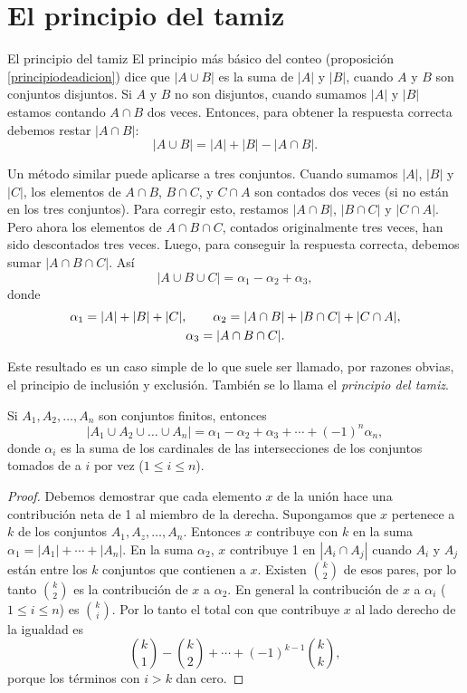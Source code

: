 

\appendix
\setcounter{chapter}{1}
\renewcommand{\thechapter}{\Alph{chapter}}
\chapter[El principio del tamiz]{El principio del tamiz} \label{principiodeltamiz}

\begin{section}{El principio del tamiz}\label{Ap1.2}
El principio más básico del conteo (proposición \ref{principiodeadicion}) dice que $|A \cup B|$ es la suma de $|A|$ y $|B|$, cuando $A$ y $B$ son conjuntos disjuntos. Si $A$ y $B$ no son disjuntos, cuando sumamos $|A|$ y $|B|$ estamos contando $A \cap B$ dos veces. Entonces, para obtener la respuesta correcta debemos restar $|A \cap B|$:
$$
|A \cup B| = |A|+|B| - |A \cap B|.
$$

Un método similar puede aplicarse a tres conjuntos. Cuando sumamos $|A|$, $|B|$ y $|C|$, los elementos de $A \cap B$, $B \cap C$, y $C \cap A$ son contados dos veces (si no están en los tres conjuntos). Para corregir esto, restamos $|A \cap B|$, $|B \cap C|$ y $|C \cap A|$. Pero ahora los elementos de $A \cap B \cap C$, contados originalmente tres veces, han sido descontados tres veces. Luego, para conseguir la respuesta correcta, debemos sumar $|A \cap B \cap C|$. Así
$$
|A \cup B\cup C|= \alpha_1-\alpha_2+\alpha_3,
$$ 
donde
$$\gathered
\alpha_1=|A|+|B|+|C|,\qquad \alpha_2= |A \cap B|+|B \cap C|+|C \cap A|, \\
\alpha_3 = |A \cap B \cap C|.
\endgathered
$$

Este resultado es un caso simple de lo que suele ser llamado, por razones obvias, el principio de inclusión y exclusión. También  se lo llama el \textit{principio del tamiz}.  

\begin{teorema}\label{tA1.2} Si $A_1,A_2,\ldots,A_n$ son conjuntos finitos, entonces 
$$ |A_1 \cup A_2 \cup \ldots \cup A_n|= \alpha_1-\alpha_2+\alpha_3 + \cdots +(-1)^n\alpha_n, $$ donde $\alpha_i$ es la suma de los cardinales de las intersecciones de los conjuntos tomados de a $i$ por vez ($1\le i \le n$).
\end{teorema}
\begin{proof} Debemos demostrar que cada elemento $x$ de la unión hace una contribución neta de 1 al miembro de la derecha. Supongamos que $x$ pertenece a $k$ de los conjuntos $A_1, A_z,\ldots,A_n$. Entonces $x$  contribuye con $k$ en la suma $\alpha_1=|A_1|+\cdots+|A_n|$. En la suma $\alpha_2$, $x$ contribuye 1 en $|A_i \cap A_j|$ cuando $A_i$ y $A_j$ están entre los $k$ conjuntos que contienen a $x$. Existen $\binom{k}{2}$ de esos pares, por lo tanto $\binom{k}{2}$ es la contribución de $x$ a $\alpha_2$. En general la contribución de $x$ a $\alpha_i$ ($1 \le i \le n$) es $\binom{k}{i}$. Por lo tanto el total con que contribuye $x$ al lado derecho de la igualdad es 
$$
\binom{k}{1} -\binom{k}{2} + \cdots + (-1)^{k-1} \binom{k}{k},
$$
porque los términos con $i > k$ dan cero.


\end{proof}
\end{section}
